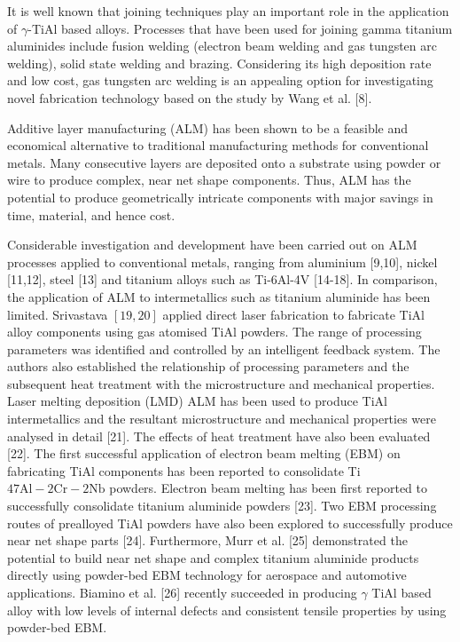 \documentclass[10pt]{article}
\begin{document}
It is well known that joining techniques play an important role in the application of $\gamma$-TiAl based alloys. Processes that have been used for joining gamma titanium aluminides include fusion welding (electron beam welding and gas tungsten arc welding), solid state welding and brazing. Considering its high deposition rate and low cost, gas tungsten arc welding is an appealing option for investigating novel fabrication technology based on the study by Wang et al. [8].

Additive layer manufacturing (ALM) has been shown to be a feasible and economical alternative to traditional manufacturing methods for conventional metals. Many consecutive layers are deposited onto a substrate using powder or wire to produce complex, near net shape components. Thus, ALM has the potential to produce geometrically intricate components with major savings in time, material, and hence cost.

Considerable investigation and development have been carried out on ALM processes applied to conventional metals, ranging from aluminium [9,10], nickel [11,12], steel [13] and titanium alloys such as Ti-6Al-4V [14-18]. In comparison, the application of ALM to intermetallics such as titanium aluminide has been limited. Srivastava $[19,20]$ applied direct laser fabrication to fabricate TiAl alloy components using gas atomised TiAl powders. The range of processing parameters was identified and controlled by an intelligent feedback system. The authors also established the relationship of processing parameters and the subsequent heat treatment with the microstructure and mechanical properties. Laser melting deposition (LMD) ALM has been used to produce TiAl intermetallics and the resultant microstructure and mechanical properties were analysed in detail [21]. The effects of heat treatment have also been evaluated [22]. The first successful application of electron beam melting (EBM) on fabricating TiAl components has been reported to consolidate Ti$47 \mathrm{Al}-2 \mathrm{Cr}-2 \mathrm{Nb}$ powders. Electron beam melting has been first reported to successfully consolidate titanium aluminide powders [23]. Two EBM processing routes of prealloyed TiAl powders have also been explored to successfully produce near net shape parts [24]. Furthermore, Murr et al. [25] demonstrated the potential to build near net shape and complex titanium aluminide products directly using powder-bed EBM technology for aerospace and automotive applications. Biamino et al. [26] recently succeeded in producing $\gamma$ TiAl based alloy with low levels of internal defects and consistent tensile properties by using powder-bed EBM.
\end{document}
